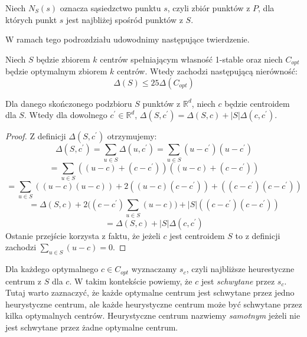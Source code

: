 \begin{definition}
    Niech $N_{S}(s)$ oznacza sąsiedzctwo punktu $s$, czyli zbiór punktów z $P$, dla których punkt $s$ jest najbliżej spośród punktów z $S$.
\end{definition}

W ramach tego podrozdziału udowodnimy następujące twierdzenie.

\begin{thm}{\cite{10.1145/1007352.1007400}}
    Niech $S$ będzie zbiorem $k$ centrów spełniającym własność 1-stable oraz niech $C_{opt}$ będzie optymalnym zbiorem $k$ centrów.
    Wtedy zachodzi następującą nierówność:
    \begin{equation}
        \Delta(S) \leq 25 \Delta(C_{opt})
    \end{equation} 
\end{thm}

\begin{lemma}{\cite{10.1145/1007352.1007400}}
    Dla danego skończonego podzbioru $S$ punktów z $\mathbb{R}^d$, niech $c$ będzie centroidem dla $S$. Wtedy dla dowolnego $c^{'} \in \mathbb{R}^d$, $\Delta(S, c^{'}) = \Delta(S, c) + |S|\Delta(c, c^{'})$.
\end{lemma}
\begin{proof}
    Z definicji $\Delta(S, c^{'})$ otrzymujemy:
    \begin{equation}
        \Delta(S, c^{'}) = \sum_{u \in S} \Delta(u, c^{'}) =  \sum_{u \in S} (u - c^{'}) (u - c^{'})
    \end{equation}
    \begin{equation}
         = \sum_{u \in S} ((u - c) + (c - c^{'})) ((u - c) + (c - c^{'}))
    \end{equation}
    \begin{equation}
        = \sum_{u \in S} ((u - c)(u - c)) + 2((u - c)(c - c^{'})) + ((c - c^{'})(c - c^{'}))
    \end{equation}
    \begin{equation}
        = \Delta(S, c) + 2\Big( (c - c^{'}) \sum_{u \in S} (u - c) \Big) + |S|((c - c^{'})(c - c^{'}))
    \end{equation}
    \begin{equation}
        = \Delta(S, c) + |S|\Delta(c,c^{'})
    \end{equation}
    Ostanie przejście korzysta z faktu, że jeżeli $c$ jest centroidem $S$ to z definicji zachodzi $\sum_{u \in S} (u - c) = 0$.
\end{proof}

\noindent
Dla każdego optymalnego $c \in C_{opt}$ wyznaczamy $s_{c}$, czyli najbliższe heurestyczne centrum z $S$ dla $c$.
W takim kontekście powiemy, że $c$ jest \textit{schwytane} przez $s_{c}$.
Tutaj warto zaznaczyć, że każde optymalne centrum jest schwytane przez jedno heurystyczne centrum, ale każde heurystyczne centrum może być schwytane przez kilka optymalnych centrów.
Heurystyczne centrum nazwiemy \textit{samotnym} jeżeli nie jest schwytane przez żadne optymalne centrum.

